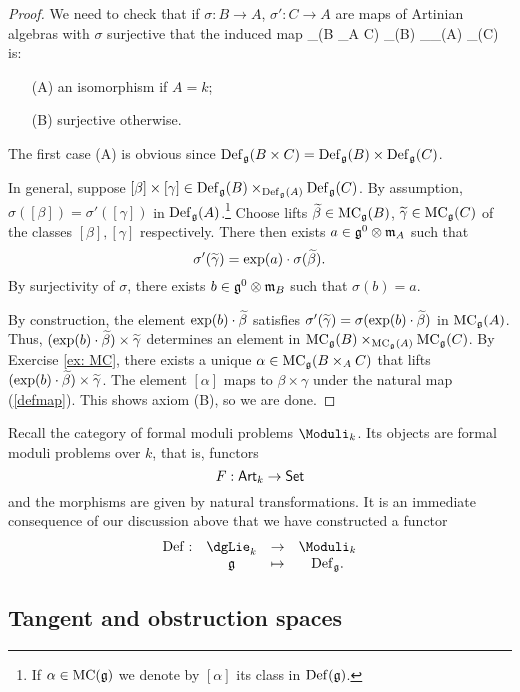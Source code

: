\documentclass[11pt]{amsart}
\begin{document}
\begin{proof}
We need to check that if $\sigma : B \to A$, $\sigma' : C \to A$ are maps of Artinian algebras with $\sigma$ surjective that the induced map
\beqn\label{defmap}
\Def_\fg (B \times_A C) \to \Def_\fg(B) \times_{\Def_\fg(A)} \Def_\fg(C)
\eeqn
is:
\begin{itemize}
\item[(A)] an isomorphism if $A = k$;
\item[(B)] surjective otherwise. 
\end{itemize} 
The first case (A) is obvious since $\Def_\fg(B \times C) = \Def_{\fg}(B) \times \Def_\fg(C)$. 

In general, suppose $[\beta] \times [\gamma] \in \Def_\fg(B) \times_{\Def_\fg(A)} \Def_\fg(C)$.
By assumption, $\sigma([\beta]) = \sigma'([\gamma])$ in $\Def_\fg(A)$.\footnote{If $\alpha \in \MC(\fg)$ we denote by $[\alpha]$ its class in $\Def(\fg)$.}
Choose lifts $\Tilde{\beta} \in \MC_\fg (B)$, $\Tilde{\gamma} \in \MC_\fg(C)$ of the classes $[\beta], [\gamma]$ respectively.
There then exists $a \in \fg^0 \tensor \fm_A$ such that 
\[
\sigma'(\Tilde{\gamma}) = \exp(a) \cdot \sigma(\Tilde{\beta}) .
\] 
By surjectivity of $\sigma$, there exists $b \in \fg^0 \tensor \fm_B$ such that $\sigma(b) = a$. 

By construction, the element $\exp(b) \cdot \Tilde{\beta}$ satisfies $\sigma'(\Tilde{\gamma}) = \sigma(\exp(b) \cdot \Tilde{\beta})$ in $\MC_\fg(A)$. 
Thus, $(\exp(b) \cdot \Tilde{\beta}) \times \Tilde{\gamma}$ determines an element in $\MC_\fg(B) \times_{\MC_\fg(A)} \MC_\fg(C)$.
By Exercise \ref{ex: MC}, there exists a unique $\alpha \in \MC_\fg (B \times_A C)$ that lifts $(\exp(b) \cdot \Tilde{\beta}) \times \Tilde{\gamma}$. 
The element $[\alpha]$ maps to $\beta \times \gamma$ under the natural map (\ref{defmap}).
This shows axiom (B), so we are done. 
\end{proof}

Recall the category of formal moduli problems $\Moduli_k$. 
Its objects are formal moduli problems over $k$, that is, functors
\[
F : \Art_k \to \Set
\]
and the morphisms are given by natural transformations. 
It is an immediate consequence of our discussion above that we have constructed a functor
\[
\begin{array}{cccc}
\Def : & \dgLie_k & \to & \Moduli_k \\
& \fg & \mapsto & \Def_\fg .
\end{array}
\] 

\subsection{Tangent and obstruction spaces}
\end{document}
